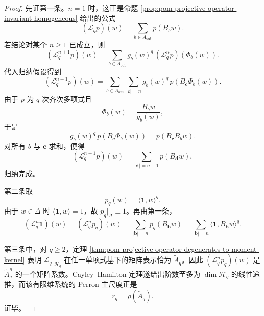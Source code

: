 \begin{proof}
先证第一条。\(n=1\) 时，这正是命题 \ref{prop:pom-projective-operator-invariant-homogeneous} 给出的公式
\[
(\mathcal L_q p)(w)=\sum_{b\in A_{\mathrm{out}}}p(B_bw).
\]
若结论对某个 \(n\ge 1\) 已成立，则
\[
(\mathcal L_q^{n+1}p)(w)
=
\sum_{b\in A_{\mathrm{out}}}g_b(w)^q\,(\mathcal L_q^n p)(\Phi_b(w)).
\]
代入归纳假设得到
\[
(\mathcal L_q^{n+1}p)(w)
=
\sum_{b\in A_{\mathrm{out}}}
\sum_{|\mathbf c|=n}
g_b(w)^q\,p(B_{\mathbf c}\Phi_b(w)).
\]
由于 \(p\) 为 \(q\) 次齐次多项式且
\[
\Phi_b(w)=\frac{B_bw}{g_b(w)},
\]
于是
\[
g_b(w)^q\,p(B_{\mathbf c}\Phi_b(w))
=
p(B_{\mathbf c}B_bw).
\]
对所有 \(b\) 与 \(\mathbf c\) 求和，便得
\[
(\mathcal L_q^{n+1}p)(w)=\sum_{|\mathbf d|=n+1}p(B_{\mathbf d}w),
\]
归纳完成。

第二条取
\[
p_q(w)=\langle \mathbf 1,w\rangle^q.
\]
由于 \(w\in\Delta\) 时 \(\langle \mathbf 1,w\rangle=1\)，故 \(p_q|_{\Delta}\equiv 1\)。再由第一条，
\[
(\mathcal L_q^n\mathbf 1)(w)
=
(\mathcal L_q^n p_q)(w)
=
\sum_{|\mathbf b|=n}p_q(B_{\mathbf b}w)
=
\sum_{|\mathbf b|=n}\langle \mathbf 1,B_{\mathbf b}w\rangle^q.
\]

第三条中，对 \(q\ge 2\)，定理 \ref{thm:pom-projective-operator-degenerates-to-moment-kernel} 表明 \(\mathcal L_q|_{\mathcal H_q}\) 在任一单项式基下的矩阵表示恰为 \(\widetilde A_q\)。因此 \((\mathcal L_q^n p_q)(w)\) 是 \(\widetilde A_q^n\) 的一个矩阵系数。Cayley--Hamilton 定理遂给出阶数至多为 \(\dim\mathcal H_q\) 的线性递推，而该有限维系统的 Perron 主尺度正是
\[
r_q=\rho(\widetilde A_q).
\]
证毕。
\end{proof}

